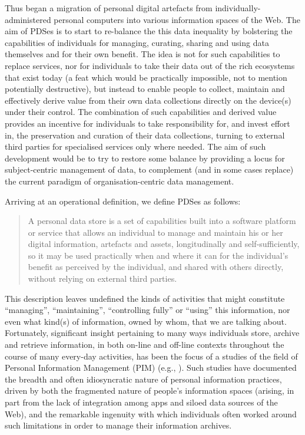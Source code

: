 \documentclass{acm_proc_article-sp}
\begin{document}
Thus began a migration of personal digital artefacts from individually-administered personal computers into various information spaces of the Web. The aim of PDSes is to start to re-balance the this data inequality by bolstering the capabilities of individuals for managing, curating, sharing and using data themselves and for their own benefit. The idea is not for such capabilities to replace services, nor for individuals to take their data out of the rich ecosystems that exist today (a feat which would be practically impossible, not to mention potentially destructive), but instead to enable people to collect, maintain and effectively derive value from their own data collections directly on the device(s) under their control. The combination of such capabilities and derived value provides an incentive for individuals to take responsibility for, and invest effort in, the preservation and curation of their data collections, turning to external third parties for specialised services only where needed. The aim of such development would be to try to restore some balance by providing a locus for subject-centric management of data, to complement (and in some cases replace) the current paradigm of organisation-centric data management.

Arriving at an operational definition, we define PDSes as follows:

\begin{quote}

	A personal data store is a set of capabilities built into a software platform or service that allows an individual to manage and maintain his or her digital information, artefacts and assets, longitudinally and self-sufficiently, so it may be used practically when and where it can for the individual's benefit as perceived by the individual, and shared with others directly, without relying on external third parties. 

\end{quote}

This description leaves undefined the kinds of activities that might constitute ``managing'', ``maintaining'', ``controlling fully'' or ``using'' this information, nor even what kind(s) of information, owned by whom, that we are talking about. Fortunately, significant insight pertaining to many ways individuals store, archive and retrieve information, in both on-line and off-line contexts throughout the course of many every-day activities, has been the focus of a studies of the field of Personal Information Management (PIM) (e.g., \cite{sellen2003myth,bernstein2008information,van2011finders}).  Such studies have documented the breadth and often idiosyncratic nature of personal information practices, driven by both the fragmented nature of people's information spaces (arising, in part from the lack of integration among apps and siloed data sources of the Web), and the remarkable ingenuity with which individuals often worked around such limitations in order to manage their information archives.  
\end{document}
